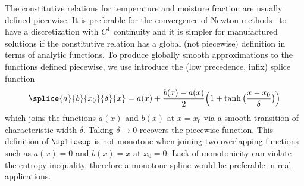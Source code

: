 The constitutive relations for temperature and moisture fraction are usually defined piecewise.
It is preferable for the convergence of Newton methods~\citep[\cf][]{gropp2000globalized} to have a discretization with $C^1$ continuity and it is simpler for manufactured solutions if the constitutive relation has a global (\ie not piecewise) definition in terms of analytic functions.
To produce globally smooth approximations to the functions defined piecewise, we use introduce the (low precedence, infix) splice function
\begin{equation*}
  \splice{a}{b}{x_0}{\delta}{x} = a(x) + \frac{b(x)-a(x)}{2} \Big(1+\tanh \big(\frac{x-x_0}{\delta} \big) \Big)
\end{equation*}
which joins the functions $a(x)$ and $b(x)$ at $x = x_0$ via a smooth transition of characteristic width $\delta$.
Taking $\delta \to 0$ recovers the piecewise function.
This definition of $\spliceop$ is not monotone when joining two overlapping functions such as $a(x) = 0$ and $b(x) = x$ at $x_0 = 0$.
Lack of monotonicity can violate the entropy inequality, therefore a monotone spline would be preferable in real applications.

